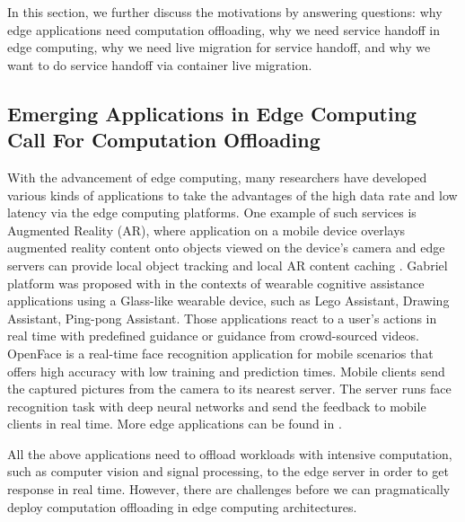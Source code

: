 In this section, we further discuss the motivations by answering
questions: why edge applications need computation offloading, why we need  
service handoff in edge computing, why we need live migration for service handoff, and why we want to do service handoff via container live migration.

\subsection{Emerging Applications in Edge Computing Call For Computation Offloading}

With the advancement of edge computing, many researchers have developed various kinds of applications to take the advantages of the high data rate and low latency via the edge computing platforms. 
One example of such services is Augmented Reality (AR), where application on a mobile device overlays augmented reality content
onto objects viewed on the device's camera and edge servers can
provide local object tracking and local AR content caching
\cite{satya2009case,MEC2014initiative,MEC2015-5G,hao2017challenges}.
%
Gabriel platform \cite{ha2014wearable}  was proposed with in the contexts of wearable cognitive assistance applications using a Glass-like wearable device, such as Lego Assistant, Drawing Assistant, Ping-pong Assistant.%
Those applications react to a user's actions in real time with predefined guidance or guidance from crowd-sourced videos. 
%
%
OpenFace\cite{openface2016} is a real-time face recognition application for mobile scenarios that offers high accuracy with low training and prediction times. Mobile clients send the captured pictures from the camera to its nearest server. The server runs face recognition task with deep neural networks and send the feedback to mobile clients in real time.  
More edge applications can be found in \cite{yi2015fog,yi2015survey,satya2017edge}.

All the above applications need to offload workloads with intensive computation, such as computer vision and signal processing, to the edge server in order to get response in real time. However, there are challenges before we can pragmatically deploy computation offloading in edge computing architectures. 

